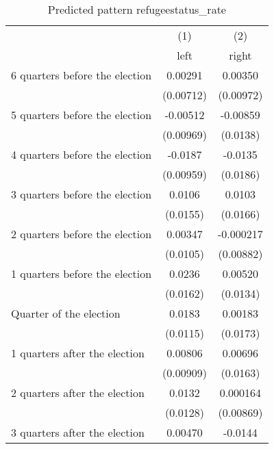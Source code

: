 \begin{table}[htbp]\centering
\def\sym#1{\ifmmode^{#1}\else\(^{#1}\)\fi}
\caption{Predicted pattern refugeestatus\_rate}
\begin{tabular}{l*{2}{c}}
\hline\hline
                    &\multicolumn{1}{c}{(1)}&\multicolumn{1}{c}{(2)}\\
                    &\multicolumn{1}{c}{left}&\multicolumn{1}{c}{right}\\
\hline
 6 quarters before the election&     0.00291         &     0.00350         \\
                    &   (0.00712)         &   (0.00972)         \\
[1em]
 5 quarters before the election&    -0.00512         &    -0.00859         \\
                    &   (0.00969)         &    (0.0138)         \\
[1em]
 4 quarters before the election&     -0.0187         &     -0.0135         \\
                    &   (0.00959)         &    (0.0186)         \\
[1em]
 3 quarters before the election&      0.0106         &      0.0103         \\
                    &    (0.0155)         &    (0.0166)         \\
[1em]
 2 quarters before the election&     0.00347         &   -0.000217         \\
                    &    (0.0105)         &   (0.00882)         \\
[1em]
 1 quarters before the election&      0.0236         &     0.00520         \\
                    &    (0.0162)         &    (0.0134)         \\
[1em]
Quarter of the election&      0.0183         &     0.00183         \\
                    &    (0.0115)         &    (0.0173)         \\
[1em]
 1 quarters after the election&     0.00806         &     0.00696         \\
                    &   (0.00909)         &    (0.0163)         \\
[1em]
 2 quarters after the election&      0.0132         &    0.000164         \\
                    &    (0.0128)         &   (0.00869)         \\
[1em]
 3 quarters after the election&     0.00470         &     -0.0144         \\

\end{tabular}
\end{table}

